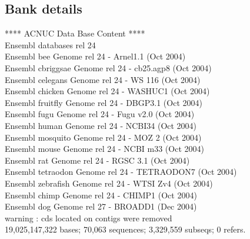 \documentclass{article}
\begin{document}
\begin{Schunk}
\subsection{Bank details}
            ****     ACNUC Data Base Content      ****  \\
	     Ensembl databases rel 24\\
             Ensembl bee  Genome rel 24 - Arnel1.1 (Oct 2004)\\
             Ensembl cbriggsae  Genome rel 24 - cb25.agp8 (Oct 2004)\\
             Ensembl celegans  Genome rel 24 - WS 116 (Oct 2004)\\
             Ensembl chicken  Genome rel 24 - WASHUC1 (Oct 2004)\\
             Ensembl fruitfly  Genome rel 24 - DBGP3.1 (Oct 2004)\\
             Ensembl fugu  Genome rel 24 - Fugu v2.0 (Oct 2004)\\
             Ensembl human  Genome rel 24 - NCBI34 (Oct 2004)\\
             Ensembl mosquito  Genome rel 24 - MOZ 2 (Oct 2004)\\
             Ensembl mouse  Genome rel 24 - NCBI m33 (Oct 2004)\\
             Ensembl rat  Genome rel 24 - RGSC 3.1 (Oct 2004)\\
             Ensembl tetraodon  Genome rel 24 - TETRAODON7 (Oct 2004)\\
             Ensembl zebrafish  Genome rel 24 - WTSI Zv4 (Oct 2004)\\
             Ensembl chimp  Genome rel 24 - CHIMP1 (Oct 2004)\\
	     Ensembl dog  Genome rel 27 - BROADD1 (Dec 2004)\\
   warning : cds located on contigs were removed\\
19,025,147,322 bases; 70,063 sequences; 3,329,559 subseqs; 0 refers.


\end{Schunk}
\end{document}
